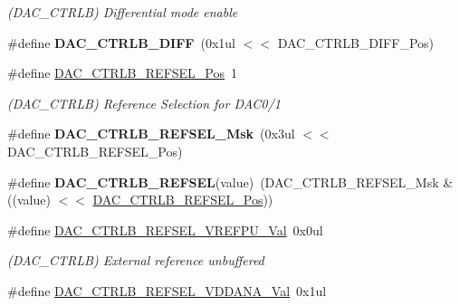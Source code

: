 \begin{DoxyCompactItemize}
\begin{DoxyCompactList}\small\item\em (D\+A\+C\+\_\+\+C\+T\+R\+L\+B) Differential mode enable \end{DoxyCompactList}\item 
\hypertarget{group___s_a_m_l21___d_a_c_ga03edadd68f47c3766a9b49135a8dc321}{}\#define {\bfseries D\+A\+C\+\_\+\+C\+T\+R\+L\+B\+\_\+\+D\+I\+F\+F}~(0x1ul $<$$<$ D\+A\+C\+\_\+\+C\+T\+R\+L\+B\+\_\+\+D\+I\+F\+F\+\_\+\+Pos)\label{group___s_a_m_l21___d_a_c_ga03edadd68f47c3766a9b49135a8dc321}

\item 
\hypertarget{group___s_a_m_l21___d_a_c_gace1da3ee1cda6efe12a220080a718b99}{}\#define \hyperlink{group___s_a_m_l21___d_a_c_gace1da3ee1cda6efe12a220080a718b99}{D\+A\+C\+\_\+\+C\+T\+R\+L\+B\+\_\+\+R\+E\+F\+S\+E\+L\+\_\+\+Pos}~1\label{group___s_a_m_l21___d_a_c_gace1da3ee1cda6efe12a220080a718b99}

\begin{DoxyCompactList}\small\item\em (D\+A\+C\+\_\+\+C\+T\+R\+L\+B) Reference Selection for D\+A\+C0/1 \end{DoxyCompactList}\item 
\hypertarget{group___s_a_m_l21___d_a_c_ga257979650aa6e806ad98f4095f58dd52}{}\#define {\bfseries D\+A\+C\+\_\+\+C\+T\+R\+L\+B\+\_\+\+R\+E\+F\+S\+E\+L\+\_\+\+Msk}~(0x3ul $<$$<$ D\+A\+C\+\_\+\+C\+T\+R\+L\+B\+\_\+\+R\+E\+F\+S\+E\+L\+\_\+\+Pos)\label{group___s_a_m_l21___d_a_c_ga257979650aa6e806ad98f4095f58dd52}

\item 
\hypertarget{group___s_a_m_l21___d_a_c_gab75aa87cd7f0a1813d5e73f2dba5057e}{}\#define {\bfseries D\+A\+C\+\_\+\+C\+T\+R\+L\+B\+\_\+\+R\+E\+F\+S\+E\+L}(value)~(D\+A\+C\+\_\+\+C\+T\+R\+L\+B\+\_\+\+R\+E\+F\+S\+E\+L\+\_\+\+Msk \& ((value) $<$$<$ \hyperlink{group___s_a_m_l21___d_a_c_gace1da3ee1cda6efe12a220080a718b99}{D\+A\+C\+\_\+\+C\+T\+R\+L\+B\+\_\+\+R\+E\+F\+S\+E\+L\+\_\+\+Pos}))\label{group___s_a_m_l21___d_a_c_gab75aa87cd7f0a1813d5e73f2dba5057e}

\item 
\hypertarget{group___s_a_m_l21___d_a_c_ga1fa8cea85f63628846fe1cffd66ce84d}{}\#define \hyperlink{group___s_a_m_l21___d_a_c_ga1fa8cea85f63628846fe1cffd66ce84d}{D\+A\+C\+\_\+\+C\+T\+R\+L\+B\+\_\+\+R\+E\+F\+S\+E\+L\+\_\+\+V\+R\+E\+F\+P\+U\+\_\+\+Val}~0x0ul\label{group___s_a_m_l21___d_a_c_ga1fa8cea85f63628846fe1cffd66ce84d}

\begin{DoxyCompactList}\small\item\em (D\+A\+C\+\_\+\+C\+T\+R\+L\+B) External reference unbuffered \end{DoxyCompactList}\item 
\hypertarget{group___s_a_m_l21___d_a_c_gae326fd37097c45092004ad8658ef7e64}{}\#define \hyperlink{group___s_a_m_l21___d_a_c_gae326fd37097c45092004ad8658ef7e64}{D\+A\+C\+\_\+\+C\+T\+R\+L\+B\+\_\+\+R\+E\+F\+S\+E\+L\+\_\+\+V\+D\+D\+A\+N\+A\+\_\+\+Val}~0x1ul\label{group___s_a_m_l21___d_a_c_gae326fd37097c45092004ad8658ef7e64}


\end{DoxyCompactItemize}
